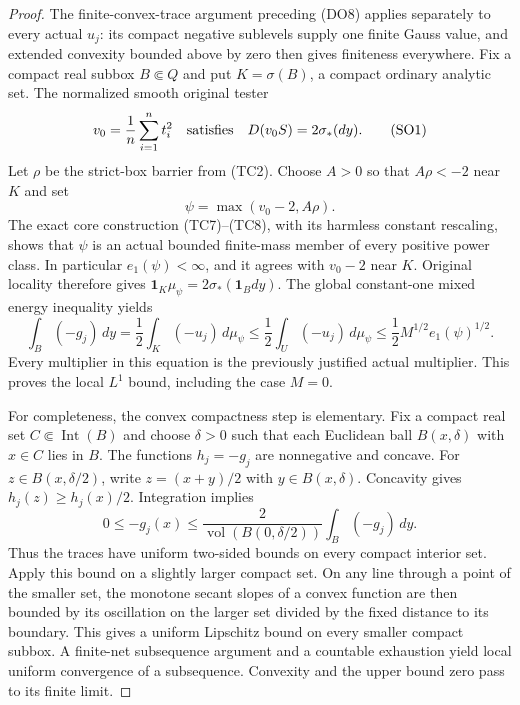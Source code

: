 \documentclass[11pt,a4paper]{article}
\numberwithin{equation}{section}
\theoremstyle{definition}
\theoremstyle{remark}
\begin{document}
\begin{proof}
The finite-convex-trace argument preceding (DO8) applies separately
to every actual $u_j$: its compact negative sublevels supply one
finite Gauss value, and extended convexity bounded above by zero
then gives finiteness everywhere.  Fix a compact real subbox
$B\Subset Q$ and put $K=\sigma(B)$, a compact ordinary analytic
set.  The normalized smooth original tester
\[
                v_0=\frac1n\sum_{i=1}^n t_i^2
           \quad\hbox{satisfies}\quad
                D(v_0S)=2\sigma_*(dy).
 \tag{SO1}
\]
Let $\rho$ be the strict-box barrier from (TC2).
Choose $A>0$ so that $A\rho<-2$ near $K$ and set
\[
                     \psi=\max(v_0-2,A\rho).
 \tag{SO2}
\]
The exact core construction (TC7)--(TC8), with its harmless
constant rescaling, shows that $\psi$ is an actual bounded
finite-mass member of every positive power class.  In particular
$e_1(\psi)<\infty$, and it agrees with $v_0-2$ near $K$.
Original locality therefore gives
$\mathbf1_K\mu_\psi=2\sigma_*(\mathbf1_Bdy)$.
The global constant-one mixed energy inequality yields
\[
 \int_B(-g_j)\,dy
   =\frac12\int_K(-u_j)\,d\mu_\psi
   \leq\frac12\int_U(-u_j)\,d\mu_\psi
   \leq\frac12M^{1/2}e_1(\psi)^{1/2}.
 \tag{SO3}
\]
Every multiplier in this equation is the previously justified
actual multiplier.  This proves the local $L^1$ bound, including
the case $M=0$.

For completeness, the convex compactness step is elementary.
Fix a compact real set $C\Subset\operatorname{Int}(B)$ and
choose $\delta>0$ such that each Euclidean ball
$B(x,\delta)$ with $x\in C$ lies in $B$.
The functions $h_j=-g_j$ are nonnegative and concave.
For $z\in B(x,\delta/2)$, write $z=(x+y)/2$ with
$y\in B(x,\delta)$.  Concavity gives
$h_j(z)\geq h_j(x)/2$.  Integration implies
\[
 0\leq -g_j(x)
       \leq\frac{2}{\operatorname{vol}(B(0,\delta/2))}
                       \int_B(-g_j)\,dy.
 \tag{SO4}
\]
Thus the traces have uniform two-sided bounds on every compact
interior set.  Apply this bound on a slightly larger compact
set.  On any line through a point of the smaller set, the
monotone secant slopes of a convex function are then bounded
by its oscillation on the larger set divided by the fixed
distance to its boundary.  This gives a uniform Lipschitz
bound on every smaller compact subbox.  A finite-net
subsequence argument and a countable exhaustion yield local
uniform convergence of a subsequence.  Convexity and the
upper bound zero pass to its finite limit.
\end{proof}
\end{document}
